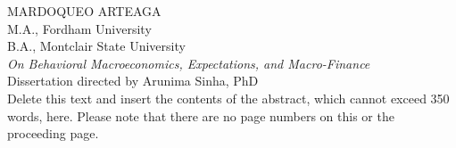 \noindent MARDOQUEO ARTEAGA \bigskip \\ 
\indent M.A., Fordham University \bigskip \\
\indent B.A., Montclair State University \bigskip \\
\indent \textit{On Behavioral Macroeconomics, Expectations, and Macro-Finance} \bigskip \\
\noindent Dissertation directed by Arunima Sinha, PhD \bigskip \\

Delete this text and insert the contents of the abstract, which cannot exceed 350 words, here. Please note that there are no page numbers on this or the proceeding page.

\newpage

